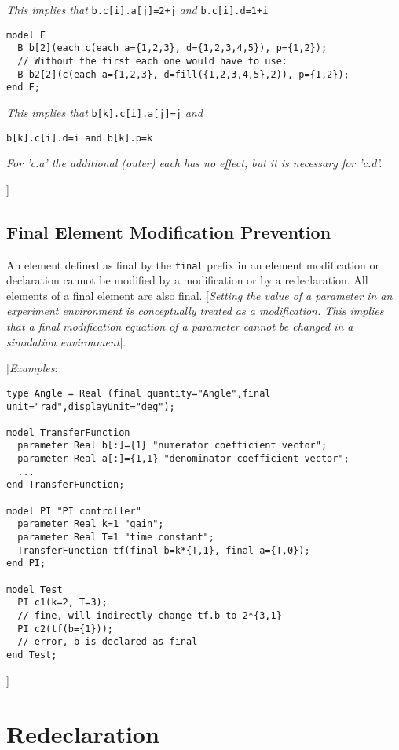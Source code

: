\emph{This implies that} \lstinline[basicstyle=\ttfamily]!b.c[i].a[j]=2+j! \emph{and}
\lstinline[basicstyle=\ttfamily]!b.c[i].d=1+i!
\begin{lstlisting}[language=modelica]
model E
  B b[2](each c(each a={1,2,3}, d={1,2,3,4,5}), p={1,2});
  // Without the first each one would have to use:
  B b2[2](c(each a={1,2,3}, d=fill({1,2,3,4,5},2)), p={1,2});
end E;
\end{lstlisting}
\emph{This implies that} \lstinline[basicstyle=\ttfamily]!b[k].c[i].a[j]=j! \emph{and}
\begin{lstlisting}[language=modelica]
  b[k].c[i].d=i and b[k].p=k
\end{lstlisting}
\emph{For 'c.a' the additional (outer) each has no effect, but it is
necessary for 'c.d'.}

{]}

\subsection{Final Element Modification Prevention}

An element defined as final by the \lstinline[basicstyle=\ttfamily]!final! prefix in an element
modification or declaration cannot be modified by a modification or by a
redeclaration. All elements of a final element are also final.
{[}\emph{Setting the value of a parameter in an experiment environment
is conceptually treated as a modification. This implies that a final
modification equation of a parameter cannot be changed in a simulation
environment}{]}.

{[}\emph{Examples}:
\begin{lstlisting}[language=modelica]
type Angle = Real (final quantity="Angle",final unit="rad",displayUnit="deg");

model TransferFunction
  parameter Real b[:]={1} "numerator coefficient vector";
  parameter Real a[:]={1,1} "denominator coefficient vector";
  ...
end TransferFunction;

model PI "PI controller"
  parameter Real k=1 "gain";
  parameter Real T=1 "time constant";
  TransferFunction tf(final b=k*{T,1}, final a={T,0});
end PI;

model Test
  PI c1(k=2, T=3);
  // fine, will indirectly change tf.b to 2*{3,1}
  PI c2(tf(b={1}));
  // error, b is declared as final
end Test;
\end{lstlisting}
{]}

\section{Redeclaration}

